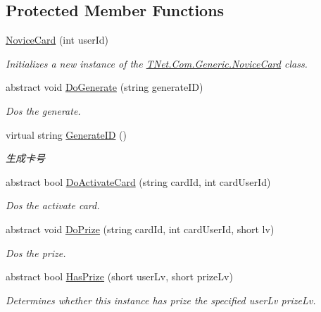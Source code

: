 \subsection*{Protected Member Functions}
\begin{DoxyCompactItemize}
\item 
\mbox{\hyperlink{class_t_net_1_1_com_1_1_generic_1_1_novice_card_a41541b8fc43aee68657721d8159e867a}{Novice\+Card}} (int user\+Id)
\begin{DoxyCompactList}\small\item\em Initializes a new instance of the \mbox{\hyperlink{class_t_net_1_1_com_1_1_generic_1_1_novice_card}{T\+Net.\+Com.\+Generic.\+Novice\+Card}} class. \end{DoxyCompactList}\item 
abstract void \mbox{\hyperlink{class_t_net_1_1_com_1_1_generic_1_1_novice_card_a80dcdabe9c68586d677e88b65439ed4a}{Do\+Generate}} (string generate\+ID)
\begin{DoxyCompactList}\small\item\em Dos the generate. \end{DoxyCompactList}\item 
virtual string \mbox{\hyperlink{class_t_net_1_1_com_1_1_generic_1_1_novice_card_ab6a0d591d0d80b86504b2ce28a7163b5}{Generate\+ID}} ()
\begin{DoxyCompactList}\small\item\em 生成卡号 \end{DoxyCompactList}\item 
abstract bool \mbox{\hyperlink{class_t_net_1_1_com_1_1_generic_1_1_novice_card_a88e0f12dc663a720fee86affd0c49941}{Do\+Activate\+Card}} (string card\+Id, int card\+User\+Id)
\begin{DoxyCompactList}\small\item\em Dos the activate card. \end{DoxyCompactList}\item 
abstract void \mbox{\hyperlink{class_t_net_1_1_com_1_1_generic_1_1_novice_card_a7832e2e74ec1b8d29a2645290ea8dd67}{Do\+Prize}} (string card\+Id, int card\+User\+Id, short lv)
\begin{DoxyCompactList}\small\item\em Dos the prize. \end{DoxyCompactList}\item 
abstract bool \mbox{\hyperlink{class_t_net_1_1_com_1_1_generic_1_1_novice_card_a4b8f5febe9ada8709a3c7d86320f2147}{Has\+Prize}} (short user\+Lv, short prize\+Lv)
\begin{DoxyCompactList}\small\item\em Determines whether this instance has prize the specified user\+Lv prize\+Lv. \end{DoxyCompactList}\end{DoxyCompactItemize}
